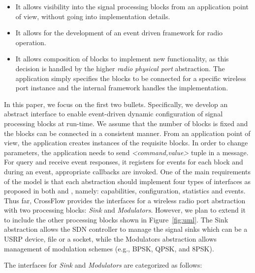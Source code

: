 \begin{itemize}
\item It allows visibility into the signal processing blocks from an application point of view, without going into implementation details.
\item It allows for the development of an event driven framework for radio operation.
\item It allows composition of blocks to implement new functionality, as this decision is handled by the higher \emph{radio physical port} abstraction. The application simply specifies the blocks to be connected for a specific wireless port instance and the internal framework handles the implementation.
\end{itemize}

In this paper, we focus on the first two bullets. Specifically, we develop an abstract interface to enable event-driven dynamic configuration of signal processing blocks at run-time. We assume that the number of blocks is fixed and the blocks can be connected in a consistent manner. From an application point of view, the application creates instances of the requisite blocks. In order to change parameters, the application needs to send \emph{<command,value>} tuple in a message. For query and receive event responses, it registers for events for each block and during an event, appropriate callbacks are invoked.    
One of the main requirements of the \crossflow model is that each abstraction should implement four types of interfaces as proposed in both \cite{Casey:14} and \cite{aetherflow}, namely: capabilities, configuration, statistics and events. Thus far, CrossFlow provides the interfaces for a wireless radio port abstraction with two processing blocks: \emph{Sink} and \emph{Modulators}. However, we plan to extend it to include the other processing blocks shown in Figure~\ref{fig:uml}. The Sink abstraction allows the SDN controller to manage the signal sinks which can be a USRP device, file or a socket, while the Modulators abstraction allows management of modulation schemes (e.g., BPSK, QPSK, and 8PSK).

The interfaces for \emph{Sink} and \emph{Modulators} are categorized as follows:

